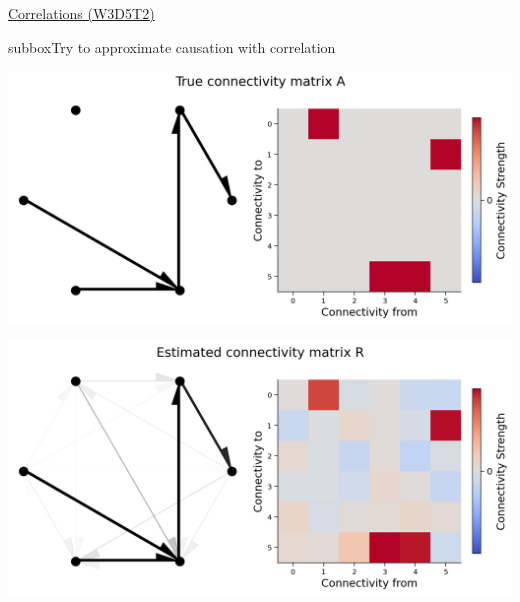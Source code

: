 \begin{textbox}{\href{https://compneuro.neuromatch.io/tutorials/W3D5_NetworkCausality/student/W3D5_Tutorial2.html}{Correlations (W3D5T2)}   }
\begin{subbox}{subbox}{Try to approximate causation with correlation}
\begin{center}
\includegraphics[scale=0.2]{Figures/NC/NC_Figure9.png}
    
\includegraphics[scale=0.2]{Figures/NC/NC_Figure10.png}
\end{center}
\end{subbox}
\end{textbox}
